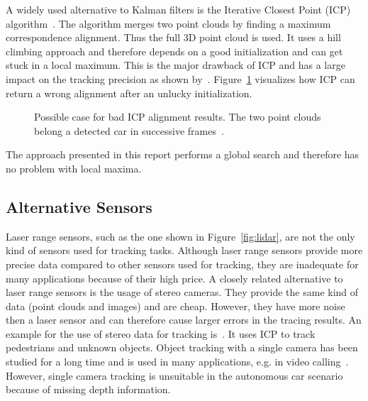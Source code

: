 \documentclass[twoside,a4paper,article]{combine}
\begin{document}
A widely used alternative to Kalman filters is the Iterative Closest
Point (ICP) algorithm~\cite{icp, icp2,
  leibe-tracking-before-detection}.
The algorithm merges
two point clouds by finding a maximum correspondence
alignment. Thus the full 3D point cloud is used. It
uses a hill climbing approach and therefore depends on a good
initialization and can get stuck in a local maximum. This is the major
drawback of ICP and has a large impact on the tracking precision as
shown by~\cite{icp-bad, icp-bad2}. Figure~\ref{fig:icp} visualizes how
ICP can return a wrong alignment after an unlucky initialization.
\begin{figure}
  \center
  
  \caption{Possible case for bad ICP alignment results. The two point
    clouds belong a detected car in successive frames~\cite{held-website}.}
  \label{fig:icp}
\end{figure}
The approach presented in this report performs a global search and
therefore has no problem with local maxima.

\subsection{Alternative Sensors}
\label{sub:slternative-sensors}
Laser range sensors, such as the one shown in Figure~\ref{fig:lidar},
are not the only kind of sensors used for tracking tasks. Although
laser range sensors provide more precise data compared to other
sensors used for tracking, they are inadequate
for many applications because of their high price. A closely related
alternative to laser range sensors is the usage of stereo
cameras. They provide the same kind of data (point clouds and images)
and are cheap. However, they have more noise then a laser sensor and
can therefore cause larger errors in the tracing results. An example
for the use of stereo data for tracking
is~\cite{leibe-tracking-before-detection}. It uses ICP to track
pedestrians and unknown objects. Object tracking with a single camera
has been studied for a long time and is used in many applications,
e.g. in video calling~\cite{single-camera-tracking}. However, single
camera tracking is unsuitable in the autonomous car scenario because
of missing depth information.
\end{document}
